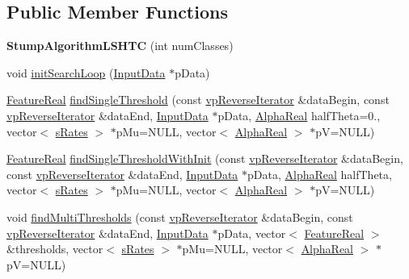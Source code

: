 \subsection*{Public Member Functions}
\begin{DoxyCompactItemize}
\item 
\hypertarget{classMultiBoost_1_1StumpAlgorithmLSHTC_ac84f20438dd702f5515f5017fe14f118}{{\bfseries Stump\-Algorithm\-L\-S\-H\-T\-C} (int num\-Classes)}\label{classMultiBoost_1_1StumpAlgorithmLSHTC_ac84f20438dd702f5515f5017fe14f118}

\item 
void \hyperlink{classMultiBoost_1_1StumpAlgorithmLSHTC_a8e2445284815ce815ef3ce3b1c624d27}{init\-Search\-Loop} (\hyperlink{classMultiBoost_1_1InputData}{Input\-Data} $\ast$p\-Data)
\item 
\hyperlink{Defaults_8h_a3a11cfe6a5d469d921716ca6291e934f}{Feature\-Real} \hyperlink{classMultiBoost_1_1StumpAlgorithmLSHTC_ab5ccbcbbfc1fdab126a8410708874f0e}{find\-Single\-Threshold} (const \hyperlink{classMultiBoost_1_1StumpAlgorithmLSHTC_afb453a312f66e27f2c3a87127b113e58}{vp\-Reverse\-Iterator} \&data\-Begin, const \hyperlink{classMultiBoost_1_1StumpAlgorithmLSHTC_afb453a312f66e27f2c3a87127b113e58}{vp\-Reverse\-Iterator} \&data\-End, \hyperlink{classMultiBoost_1_1InputData}{Input\-Data} $\ast$p\-Data, \hyperlink{Defaults_8h_a80184c4fd10ab70a1a17c5f97dcd1563}{Alpha\-Real} half\-Theta=0., vector$<$ \hyperlink{structMultiBoost_1_1sRates}{s\-Rates} $>$ $\ast$p\-Mu=N\-U\-L\-L, vector$<$ \hyperlink{Defaults_8h_a80184c4fd10ab70a1a17c5f97dcd1563}{Alpha\-Real} $>$ $\ast$p\-V=N\-U\-L\-L)
\item 
\hyperlink{Defaults_8h_a3a11cfe6a5d469d921716ca6291e934f}{Feature\-Real} \hyperlink{classMultiBoost_1_1StumpAlgorithmLSHTC_a57cf993b05e0db9f561e978997d6a74d}{find\-Single\-Threshold\-With\-Init} (const \hyperlink{classMultiBoost_1_1StumpAlgorithmLSHTC_afb453a312f66e27f2c3a87127b113e58}{vp\-Reverse\-Iterator} \&data\-Begin, const \hyperlink{classMultiBoost_1_1StumpAlgorithmLSHTC_afb453a312f66e27f2c3a87127b113e58}{vp\-Reverse\-Iterator} \&data\-End, \hyperlink{classMultiBoost_1_1InputData}{Input\-Data} $\ast$p\-Data, \hyperlink{Defaults_8h_a80184c4fd10ab70a1a17c5f97dcd1563}{Alpha\-Real} half\-Theta, vector$<$ \hyperlink{structMultiBoost_1_1sRates}{s\-Rates} $>$ $\ast$p\-Mu=N\-U\-L\-L, vector$<$ \hyperlink{Defaults_8h_a80184c4fd10ab70a1a17c5f97dcd1563}{Alpha\-Real} $>$ $\ast$p\-V=N\-U\-L\-L)
\item 
void \hyperlink{classMultiBoost_1_1StumpAlgorithmLSHTC_ab624ccc9ad805a8232015700906e6cb2}{find\-Multi\-Thresholds} (const \hyperlink{classMultiBoost_1_1StumpAlgorithmLSHTC_afb453a312f66e27f2c3a87127b113e58}{vp\-Reverse\-Iterator} \&data\-Begin, const \hyperlink{classMultiBoost_1_1StumpAlgorithmLSHTC_afb453a312f66e27f2c3a87127b113e58}{vp\-Reverse\-Iterator} \&data\-End, \hyperlink{classMultiBoost_1_1InputData}{Input\-Data} $\ast$p\-Data, vector$<$ \hyperlink{Defaults_8h_a3a11cfe6a5d469d921716ca6291e934f}{Feature\-Real} $>$ \&thresholds, vector$<$ \hyperlink{structMultiBoost_1_1sRates}{s\-Rates} $>$ $\ast$p\-Mu=N\-U\-L\-L, vector$<$ \hyperlink{Defaults_8h_a80184c4fd10ab70a1a17c5f97dcd1563}{Alpha\-Real} $>$ $\ast$p\-V=N\-U\-L\-L)

\end{DoxyCompactItemize}
